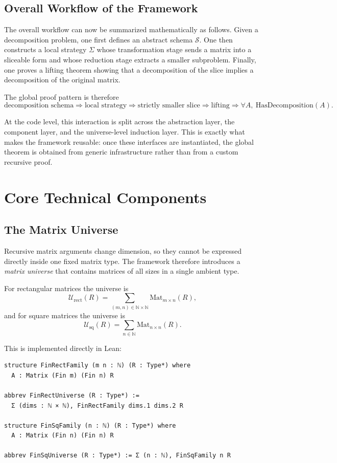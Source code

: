 \documentclass[pdflatex,sn-mathphys-num]{sn-jnl}%
\theoremstyle{thmstyleone}%
\theoremstyle{thmstyletwo}%
\theoremstyle{thmstylethree}%
\begin{document}
\subsection{Overall Workflow of the Framework}

The overall workflow can now be summarized mathematically as follows.  Given a decomposition problem, one first defines an abstract schema \(\mathcal{S}\).  One then constructs a local strategy \(\Sigma\) whose transformation stage sends a matrix into a sliceable form and whose reduction stage extracts a smaller subproblem.  Finally, one proves a lifting theorem showing that a decomposition of the slice implies a decomposition of the original matrix.

The global proof pattern is therefore
\[
\text{decomposition schema}
\Longrightarrow
\text{local strategy}
\Longrightarrow
\text{strictly smaller slice}
\Longrightarrow
\text{lifting}
\Longrightarrow
\forall A,\ \text{HasDecomposition}(A).
\]

At the code level, this interaction is split across the abstraction layer, the component layer, and the universe-level induction layer.  This is exactly what makes the framework reusable: once these interfaces are instantiated, the global theorem is obtained from generic infrastructure rather than from a custom recursive proof.

\section{Core Technical Components}
\label{sec:core-tech}

\subsection{The Matrix Universe}

Recursive matrix arguments change dimension, so they cannot be expressed directly inside one fixed matrix type.  The framework therefore introduces a \emph{matrix universe} that contains matrices of all sizes in a single ambient type.

For rectangular matrices the universe is
\[
\mathcal{U}_{\mathrm{rect}}(R)
=
\sum_{(m,n)\in \mathbb{N}\times\mathbb{N}}
\mathrm{Mat}_{m\times n}(R),
\]
and for square matrices the universe is
\[
\mathcal{U}_{\mathrm{sq}}(R)
=
\sum_{n\in\mathbb{N}}
\mathrm{Mat}_{n\times n}(R).
\]

This is implemented directly in Lean:

\begin{lstlisting}
structure FinRectFamily (m n : ℕ) (R : Type*) where
  A : Matrix (Fin m) (Fin n) R

abbrev FinRectUniverse (R : Type*) :=
  Σ (dims : ℕ × ℕ), FinRectFamily dims.1 dims.2 R

structure FinSqFamily (n : ℕ) (R : Type*) where
  A : Matrix (Fin n) (Fin n) R

abbrev FinSqUniverse (R : Type*) := Σ (n : ℕ), FinSqFamily n R
\end{lstlisting}
\end{document}
